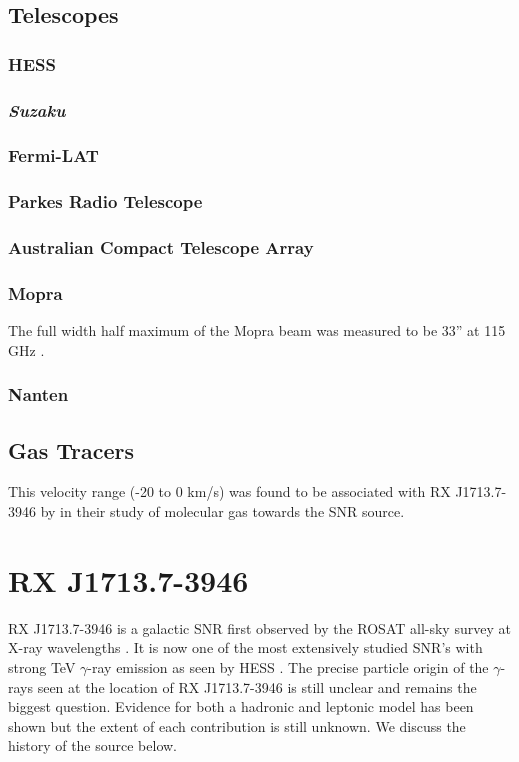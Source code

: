\documentclass[12pt,a4paper]{article}
\begin{document}
\subsection{Telescopes}
\subsubsection{HESS}
\subsubsection{\textbf{\textit{Suzaku}}}
\subsubsection{Fermi-LAT}
\subsubsection{Parkes Radio Telescope}
\subsubsection{Australian Compact Telescope Array}
\subsubsection{Mopra}
The full width half maximum of the Mopra beam was measured to be 33'' at 115 GHz \citep{2005PASA...22...62L}.
\subsubsection{Nanten}

\subsection{Gas Tracers}
This velocity range (-20 to 0 km/s) was found to be associated with RX J1713.7-3946 by \cite{2005ApJ...631..947M} in their study of molecular gas towards the SNR source.

\newpage
\section{RX J1713.7-3946}

RX J1713.7-3946 is a galactic SNR first observed by the ROSAT all-sky survey at X-ray wavelengths \citep{1996rftu.proc..267P}. It is now one of the most extensively studied SNR's with strong TeV $\gamma$-ray emission as seen by HESS \citep{2004Natur.432...75A}. The precise particle origin of the $\gamma$-rays seen at the location of RX J1713.7-3946 is still unclear and remains the biggest question. Evidence for both a hadronic and leptonic model has been shown but the extent of each contribution is still unknown. We discuss the history of the source below.
\end{document}
